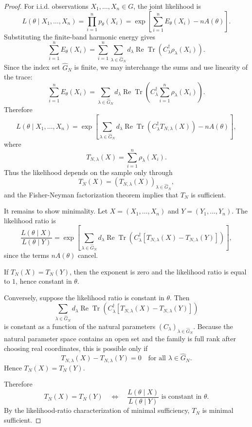 \documentclass{ssl}
\begin{document}
\begin{proof}
For i.i.d. observations \(X_1,\dots,X_n\in G\), the joint likelihood is
\[
L(\theta\mid X_1,\dots,X_n)
=
\prod_{i=1}^n p_\theta(X_i)
=
\exp\left[
\sum_{i=1}^n E_\theta(X_i)-nA(\theta)
\right].
\]
Substituting the finite-band harmonic energy gives
\[
\sum_{i=1}^n E_\theta(X_i)
=
\sum_{i=1}^n
\sum_{\lambda\in\widehat G_N}
d_\lambda
\operatorname{Re}
\operatorname{Tr}
\left(
C_\lambda^\dagger \rho_\lambda(X_i)
\right).
\]
Since the index set \(\widehat G_N\) is finite, we may interchange the sums and use
linearity of the trace:
\[
\sum_{i=1}^n E_\theta(X_i)
=
\sum_{\lambda\in\widehat G_N}
d_\lambda
\operatorname{Re}
\operatorname{Tr}
\left(
C_\lambda^\dagger
\sum_{i=1}^n \rho_\lambda(X_i)
\right).
\]
Therefore
\[
L(\theta\mid X_1,\dots,X_n)
=
\exp\left[
\sum_{\lambda\in\widehat G_N}
d_\lambda
\operatorname{Re}
\operatorname{Tr}
\left(
C_\lambda^\dagger T_{N,\lambda}(X)
\right)
-
nA(\theta)
\right],
\]
where
\[
T_{N,\lambda}(X)=\sum_{i=1}^n \rho_\lambda(X_i).
\]
Thus the likelihood depends on the sample only through
\[
T_N(X)=
\left(
T_{N,\lambda}(X)
\right)_{\lambda\in\widehat G_N},
\]
and the Fisher-Neyman factorization theorem implies that \(T_N\) is sufficient.

It remains to show minimality. Let \(X=(X_1,\dots,X_n)\) and
\(Y=(Y_1,\dots,Y_n)\). The likelihood ratio is
\[
\frac{L(\theta\mid X)}{L(\theta\mid Y)}
=
\exp\left[
\sum_{\lambda\in\widehat G_N}
d_\lambda
\operatorname{Re}
\operatorname{Tr}
\left(
C_\lambda^\dagger
\left[
T_{N,\lambda}(X)-T_{N,\lambda}(Y)
\right]
\right)
\right],
\]
since the terms \(nA(\theta)\) cancel.

If \(T_N(X)=T_N(Y)\), then the exponent is zero and the likelihood ratio is
equal to \(1\), hence constant in \(\theta\).

Conversely, suppose the likelihood ratio is constant in \(\theta\). Then
\[
\sum_{\lambda\in\widehat G_N}
d_\lambda
\operatorname{Re}
\operatorname{Tr}
\left(
C_\lambda^\dagger
\left[
T_{N,\lambda}(X)-T_{N,\lambda}(Y)
\right]
\right)
\]
is constant as a function of the natural parameters
\((C_\lambda)_{\lambda\in\widehat G_N}\). Because the natural parameter space
contains an open set and the family is full rank after choosing real
coordinates, this is possible only if
\[
T_{N,\lambda}(X)-T_{N,\lambda}(Y)=0
\quad
\text{for all }
\lambda\in\widehat G_N.
\]
Hence \(T_N(X)=T_N(Y)\).

Therefore
\[
T_N(X)=T_N(Y)
\quad\Longleftrightarrow\quad
\frac{L(\theta\mid X)}{L(\theta\mid Y)}
\text{ is constant in }\theta.
\]
By the likelihood-ratio characterization of minimal sufficiency,
\(T_N\) is minimal sufficient.
\end{proof}
\end{document}
